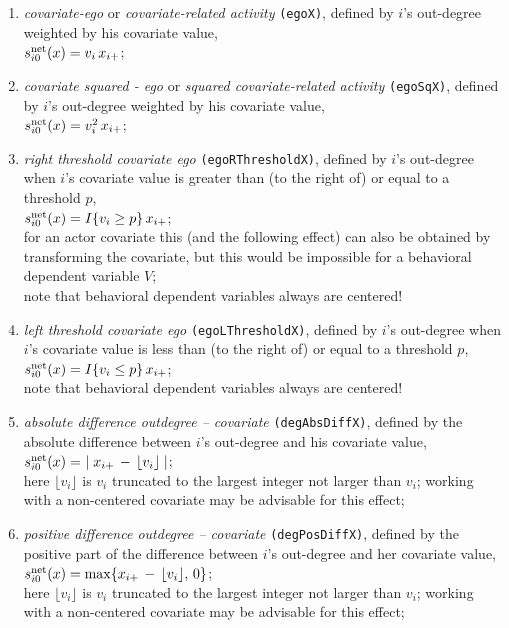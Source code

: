 \documentclass[a4paper,fleqn,11pt]{article}
\newcommand{\+}{\, + \,}
\newcommand{\vit}{\theenumi}
\begin{document}
\begin{enumerate}
 \item {\em covariate-ego} or {\em covariate-related activity}
 \texttt{(egoX)},
 defined by $i$'s out-degree weighted by his covariate value,\\
 $s^{\rm net}_{i\vit}(x) = v_i \, x_{i+} $;

 \item {\em covariate squared - ego} or {\em squared covariate-related activity}
 \texttt{(egoSqX)},
 defined by $i$'s out-degree weighted by his covariate value,\\
 $s^{\rm net}_{i\vit}(x) = v_i^2 \, x_{i+} $;

 \item {\em right threshold covariate ego}
 \texttt{(egoRThresholdX)},
 defined by $i$'s out-degree when $i$'s covariate value
 is greater than (to the right of)  or equal to a threshold $p$,\\
 $s^{\rm net}_{i\vit}(x) = I\{v_i \geq p\} \, x_{i+} $;\\
 for an actor covariate this (and the following effect)
 can also be obtained by transforming
 the covariate, but this would be impossible for a behavioral dependent
 variable $V$;\\
 note that behavioral dependent variables always are centered!

 \item {\em left threshold covariate ego}
 \texttt{(egoLThresholdX)},
 defined by $i$'s out-degree when $i$'s covariate value
 is less than (to the right of) or equal to a threshold $p$,\\
 $s^{\rm net}_{i\vit}(x) = I\{v_i \leq p\} \, x_{i+} $;\\
 note that behavioral dependent variables always are centered!

 \item {\em absolute difference outdegree -- covariate}
 \texttt{(degAbsDiffX)},
 defined by the absolute difference between $i$'s out-degree and his covariate value,\\
 $s^{\rm net}_{i\vit}(x) = \ \mid x_{i+} \,-\, \lfloor v_i \rfloor \mid $;\\
 here $\lfloor v_i \rfloor $ is $v_i$ truncated to the largest integer
 not larger than $v_i$;
 working with a non-centered covariate may be advisable for this effect;

 \item {\em positive difference outdegree -- covariate}
 \texttt{(degPosDiffX)},
 defined by the positive part of the difference between $i$'s out-degree
 and her covariate value,\\
 $s^{\rm net}_{i\vit}(x) = \max \{ x_{i+} \,-\, \lfloor v_i \rfloor  ,\, 0 \} $;\\
 here $\lfloor v_i \rfloor $ is $v_i$ truncated to the largest integer
 not larger than $v_i$;
 working with a non-centered covariate may be advisable for this effect;


\end{enumerate}
\end{document}
